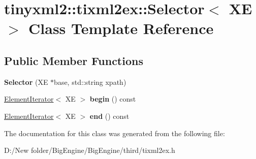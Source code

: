\hypertarget{classtinyxml2_1_1tixml2ex_1_1_selector}{}\section{tinyxml2\+:\+:tixml2ex\+:\+:Selector$<$ XE $>$ Class Template Reference}
\label{classtinyxml2_1_1tixml2ex_1_1_selector}
\subsection*{Public Member Functions}
\begin{DoxyCompactItemize}
\item 
\mbox{\label{classtinyxml2_1_1tixml2ex_1_1_selector_ae4eb4855088aad283f2baade417e05c9}} 
{\bfseries Selector} (XE $\ast$base, std\+::string xpath)
\item 
\mbox{\label{classtinyxml2_1_1tixml2ex_1_1_selector_aa67c8d64510ba64d5502aa17bc3b1d8f}} 
\mbox{\hyperlink{classtinyxml2_1_1tixml2ex_1_1_element_iterator}{Element\+Iterator}}$<$ XE $>$ {\bfseries begin} () const
\item 
\mbox{\label{classtinyxml2_1_1tixml2ex_1_1_selector_aa7c34ff132f064a78dfe0d99aaf25886}} 
\mbox{\hyperlink{classtinyxml2_1_1tixml2ex_1_1_element_iterator}{Element\+Iterator}}$<$ XE $>$ {\bfseries end} () const
\end{DoxyCompactItemize}


The documentation for this class was generated from the following file\+:\begin{DoxyCompactItemize}
\item 
D\+:/\+New folder/\+Big\+Engine/\+Big\+Engine/third/tixml2ex.\+h\end{DoxyCompactItemize}
